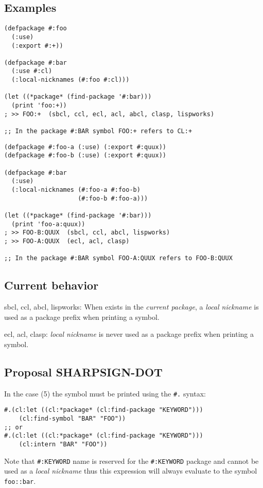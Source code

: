 \documentclass[11pt]{article}
\begin{document}
\subsection{Examples}
\label{sec:org960d981}
\begin{verbatim}
(defpackage #:foo
  (:use)
  (:export #:+))

(defpackage #:bar
  (:use #:cl)
  (:local-nicknames (#:foo #:cl)))

(let ((*package* (find-package '#:bar)))
  (print 'foo:+))
; >> FOO:+  (sbcl, ccl, ecl, acl, abcl, clasp, lispworks)

;; In the package #:BAR symbol FOO:+ refers to CL:+
\end{verbatim}

\begin{verbatim}
(defpackage #:foo-a (:use) (:export #:quux))
(defpackage #:foo-b (:use) (:export #:quux))

(defpackage #:bar
  (:use)
  (:local-nicknames (#:foo-a #:foo-b)
                    (#:foo-b #:foo-a)))

(let ((*package* (find-package '#:bar)))
  (print 'foo-a:quux))
; >> FOO-B:QUUX  (sbcl, ccl, abcl, lispworks)
; >> FOO-A:QUUX  (ecl, acl, clasp)

;; In the package #:BAR symbol FOO-A:QUUX refers to FOO-B:QUUX
\end{verbatim}
\subsection{Current behavior}
\label{sec:org749ba5d}
sbcl, ccl, abcl, lispworks:
  When exists in the \emph{current package}, a \emph{local nickname} is used as a package
  prefix when printing a symbol.

ecl, acl, clasp:
  \emph{local nickname} is never used as a package prefix when printing a symbol.
\subsection{Proposal SHARPSIGN-DOT}
\label{sec:org9cc7112}
In the case (5) the symbol must be printed using the \texttt{\#.} syntax:

\begin{verbatim}
#.(cl:let ((cl:*package* (cl:find-package "KEYWORD")))
    (cl:find-symbol "BAR" "FOO"))
;; or
#.(cl:let ((cl:*package* (cl:find-package "KEYWORD")))
    (cl:intern "BAR" "FOO"))
\end{verbatim}

Note that \texttt{\#:KEYWORD} name is reserved for the \texttt{\#:KEYWORD} package and
cannot be used as a \emph{local nickname} thus this expression will always
evaluate to the symbol \texttt{foo::bar}.
\end{document}
